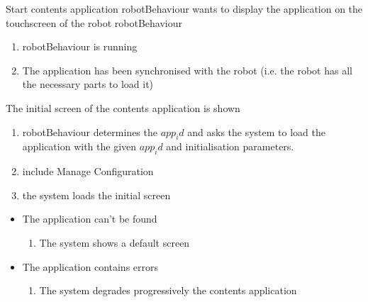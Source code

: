 \begin{suc}
{Start contents application}
{robotBehaviour wants to display the application on the touchscreen of the robot}
{robotBehaviour}
{
	\begin{enumerate}
        \item robotBehaviour is running
        \item The application has been synchronised with the robot (i.e. the robot has all the necessary parts to load it)
    \end{enumerate}
}
{
The initial screen of the contents application is shown
}
{
    \begin{enumerate}
        \item robotBehaviour determines the $app_id$ and asks the system to load the application with the given $app_id$ and initialisation parameters.
        \item include Manage Configuration
		\item the system loads the initial screen
    \end{enumerate}
}
{    
	\begin{itemize}
        \item The application can't be found
        \begin{enumerate}
        	\item The system shows a default screen
    	\end{enumerate}
    	\item The application contains errors
        \begin{enumerate}
        	\item The system degrades progressively the contents application
    	\end{enumerate}
    \end{itemize}    
}
\end{suc}


